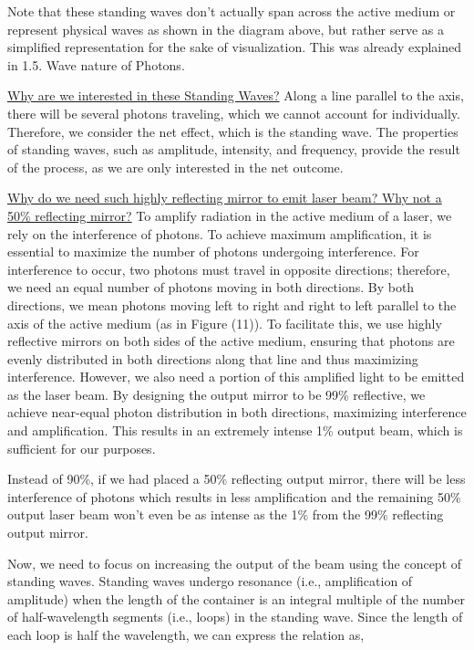 \documentclass[12pt]{article}
\begin{document}
Note that these standing waves don't actually span across the active medium or represent physical waves as shown in the diagram above, but rather serve as a simplified representation for the sake of visualization. This was already explained in 1.5. Wave nature of Photons. \vspace{.2cm}

\uline{Why are we interested in these Standing Waves?} Along a line parallel to the axis, there will be several photons traveling, which we cannot account for individually. Therefore, we consider the net effect, which is the standing wave. The properties of standing waves, such as amplitude, intensity, and frequency, provide the result of the process, as we are only interested in the net outcome. \vspace{.2cm}

\uline{Why do we need such highly reflecting mirror to emit laser beam? Why not a 50\% reflecting mirror?} 
To amplify radiation in the active medium of a laser, we rely on the interference of photons. To achieve maximum amplification, it is essential to maximize the number of photons undergoing interference. For interference to occur, two photons must travel in opposite directions; therefore, we need an equal number of photons moving in both directions. By both directions, we mean photons moving left to right and right to left parallel to the axis of the active medium (as in Figure (11)). To facilitate this, we use highly reflective mirrors on both sides of the active medium, ensuring that photons are evenly distributed in both directions along that line and thus maximizing interference. However, we also need a portion of this amplified light to be emitted as the laser beam. By designing the output mirror to be 99\% reflective, we achieve near-equal photon distribution in both directions, maximizing interference and amplification. This results in an extremely intense 1\% output beam, which is sufficient for our purposes. \vspace{.2cm}

Instead of 90\%, if we had placed a 50\% reflecting output mirror, there will be less interference of photons which results in less amplification and the remaining 50\% output laser beam won't even be as intense as the 1\% from the 99\% reflecting output mirror. \vspace{.2cm}

Now, we need to focus on increasing the output of the beam using the concept of standing waves. Standing waves undergo resonance (i.e., amplification of amplitude) when the length of the container is an integral multiple of the number of half-wavelength segments (i.e., loops) in the standing wave. Since the length of each loop is half the wavelength, we can express the relation as,
\end{document}
